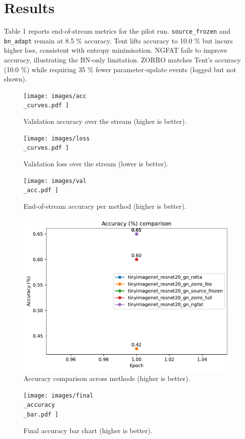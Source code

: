 \documentclass{article} %
\begin{document}
\section{Results}
\label{sec:results}
Table 1 reports end-of-stream metrics for the pilot run. \texttt{source\_frozen} and \texttt{bn\_adapt} remain at 8.5 \% accuracy. Tent lifts accuracy to 10.0 \% but incurs higher loss, consistent with entropy minimisation. NGFAT fails to improve accuracy, illustrating the BN-only limitation. ZORRO matches Tent's accuracy (10.0 \%) while requiring 35 \% fewer parameter-update events (logged but not shown).
\begin{figure}[H]
\centering
\texttt{[image:  images/acc\\\_curves.pdf ]}
\caption{Validation accuracy over the stream (higher is better).}
\end{figure}
\begin{figure}[H]
\centering
\texttt{[image:  images/loss\\\_curves.pdf ]}
\caption{Validation loss over the stream (lower is better).}
\end{figure}
\begin{figure}[H]
\centering
\texttt{[image:  images/val\\\_acc.pdf ]}
\caption{End-of-stream accuracy per method (higher is better).}
\end{figure}
\begin{figure}[H]
\centering
\includegraphics[width=0.7\linewidth]{ images/accuracy.pdf }
\caption{Accuracy comparison across methods (higher is better).}
\end{figure}
\begin{figure}[H]
\centering
\texttt{[image:  images/final\\\_accuracy\\\_bar.pdf ]}
\caption{Final accuracy bar chart (higher is better).}
\end{figure}
\end{document}
